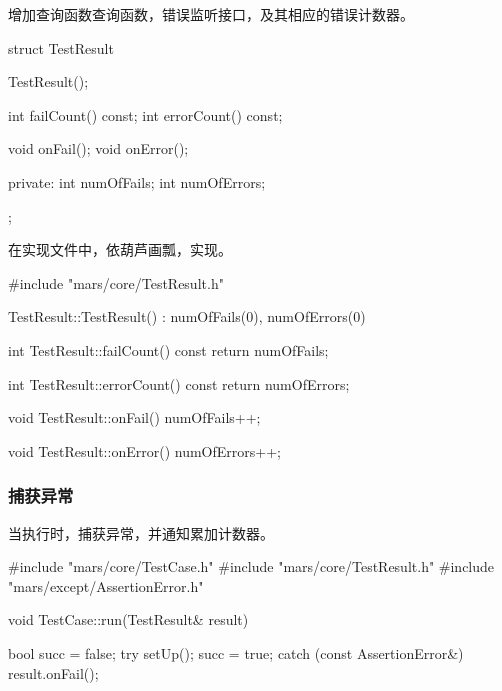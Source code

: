 \begin{content}
增加查询函数查询函数，错误监听接口，及其相应的错误计数器。

\begin{leftbar}
 \begin{c++}[caption={\ttfamily{include/mars/core/TestResult.h}}]
struct TestResult {
  TestResult();

  int failCount() const;
  int errorCount() const;

  void onFail();
  void onError();

private:
  int numOfFails;
  int numOfErrors;
};
 \end{c++}
\end{leftbar}

在实现文件中，依葫芦画瓢，实现。

\begin{leftbar}
 \begin{c++}[caption={\ttfamily{src/mars/core/TestResult.cc}}]
#include "mars/core/TestResult.h"

TestResult::TestResult()
  : numOfFails(0), numOfErrors(0) {
}

int TestResult::failCount() const {
  return numOfFails;
}

int TestResult::errorCount() const {
  return numOfErrors;
}

void TestResult::onFail() {
  numOfFails++;
}

void TestResult::onError() {
  numOfErrors++;
}
 \end{c++}
\end{leftbar}

\subsubsection{捕获异常}

当执行时，捕获异常，并通知累加计数器。

\begin{leftbar}
 \begin{c++}[caption={\ttfamily{src/mars/core/TestCase.cc}}]
#include "mars/core/TestCase.h"
#include "mars/core/TestResult.h"
#include "mars/except/AssertionError.h"

void TestCase::run(TestResult& result) {
  bool succ = false;
  try {
    setUp();
    succ = true;
  } catch (const AssertionError&) {
    result.onFail();
  }

}
\end{c++}
\end{leftbar}
\end{content}
